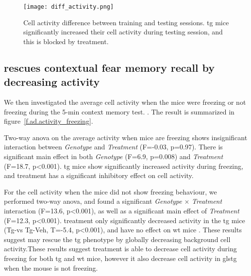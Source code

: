 \begin{figure}[h]
    \texttt{[image: diff\_activity.png]}
    \caption{Cell activity difference between training and testing sessions. \gls{tg} mice significantly increased their cell activity during testing session, and this is blocked by \tglu treatment. \label{f.ad.actdiff}}
\end{figure}


\subsection{\tglu rescues contextual fear memory recall by decreasing activity}

We then investigated the average cell activity when the mice were freezing or not freezing during the 5-min context memory test. . The result is summarized in figure~\ref{f.ad.activity_freezing}.  

Two-way \gls{anova} on the average activity when mice are freezing shows insignificant interaction between \textit{Genotype} and \textit{Treatment} (F=-0.03, p=0.97). There is significant main effect in both \textit{Genotype} (F=6.9, p=0.008) and \textit{Treatment} (F=18.7, p<0.001). \Gls{tg} mice show significantly increased activity during freezing, and \tglu treatment has a significant inhibitory effect on cell activity. 

For the cell activity when the mice did not show freezing behaviour, we performed two-way \gls{anova}, and found a significant \textit{Genotype} $\times$ \textit{Treatment} interaction (F=13.6, p<0.001), as well as a significant main effect of \textit{Treatment} (F=12.3, p<0.001). \tglu treatment only significantly decreased activity in the \gls{tg} mice (Tg-\glu vs Tg-Veh, T=-5.4, p<0.001), and have no effect on \gls{wt} mice . These results suggest \tglu may rescue the \gls{tg} phenotype by globally decreasing background cell activity.These results suggest \tglu treatment is able to decrease cell activity during freezing for both \gls{tg} and \gls{wt} mice, however it also decrease cell activity in gls{tg} when the mouse is not freezing.


